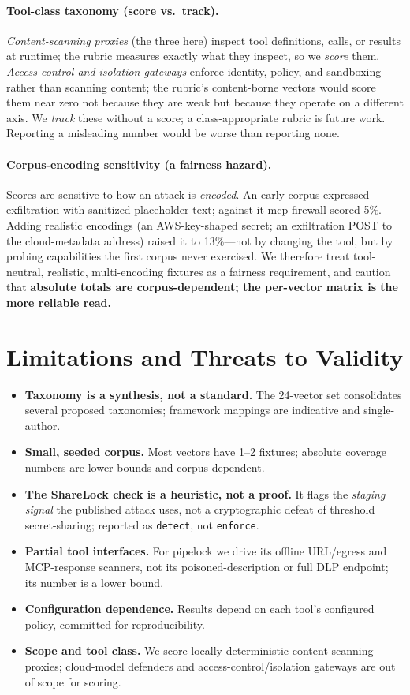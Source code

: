 \documentclass[sigconf,review]{acmart}
\begin{document}
\paragraph{Tool-class taxonomy (score vs.\ track).} \emph{Content-scanning proxies} (the three here) inspect tool definitions, calls, or results at runtime; the rubric measures exactly what they inspect, so we \emph{score} them. \emph{Access-control and isolation gateways} enforce identity, policy, and sandboxing rather than scanning content; the rubric's content-borne vectors would score them near zero not because they are weak but because they operate on a different axis. We \emph{track} these without a score; a class-appropriate rubric is future work. Reporting a misleading number would be worse than reporting none.

\paragraph{Corpus-encoding sensitivity (a fairness hazard).} Scores are sensitive to how an attack is \emph{encoded}. An early corpus expressed exfiltration with sanitized placeholder text; against it mcp-firewall scored 5\%. Adding realistic encodings (an AWS-key-shaped secret; an exfiltration POST to the cloud-metadata address) raised it to 13\%---not by changing the tool, but by probing capabilities the first corpus never exercised. We therefore treat tool-neutral, realistic, multi-encoding fixtures as a fairness requirement, and caution that \textbf{absolute totals are corpus-dependent; the per-vector matrix is the more reliable read.}

\section{Limitations and Threats to Validity}\label{sec:limits}
\begin{itemize}
\item \textbf{Taxonomy is a synthesis, not a standard.} The 24-vector set consolidates several proposed taxonomies; framework mappings are indicative and single-author.
\item \textbf{Small, seeded corpus.} Most vectors have 1--2 fixtures; absolute coverage numbers are lower bounds and corpus-dependent.
\item \textbf{The ShareLock check is a heuristic, not a proof.} It flags the \emph{staging signal} the published attack uses, not a cryptographic defeat of threshold secret-sharing; reported as \texttt{detect}, not \texttt{enforce}.
\item \textbf{Partial tool interfaces.} For pipelock we drive its offline URL/egress and MCP-response scanners, not its poisoned-description or full DLP endpoint; its number is a lower bound.
\item \textbf{Configuration dependence.} Results depend on each tool's configured policy, committed for reproducibility.
\item \textbf{Scope and tool class.} We score locally-deterministic content-scanning proxies; cloud-model defenders and access-control/isolation gateways are out of scope for scoring.
\end{itemize}
\end{document}
